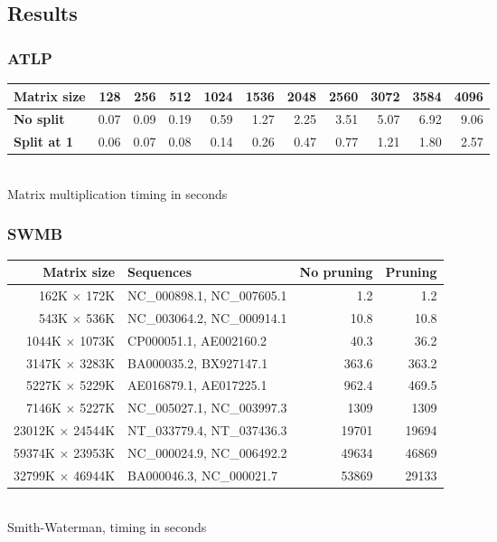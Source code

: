 \subsection*{Results}
\subsubsection*{ATLP\cite{gpu_atlp}}
\begin{center}\begin{tabular}{lrrrrrrrrrr} \toprule
\bf Matrix size & 128 & 256 & 512 & 1024 & 1536 & 2048 & 2560 & 3072 & 3584 & 4096 \\ \midrule
\bf No split & 0.07 & 0.09 & 0.19 & 0.59 & 1.27 & 2.25 & 3.51 & 5.07 & 6.92 & 9.06 \\
\bf Split at 1 & 0.06 & 0.07 & 0.08 & 0.14 & 0.26 & 0.47 & 0.77 & 1.21 & 1.80 & 2.57 \\ \bottomrule
\end{tabular} \\[4pt] Matrix multiplication timing in seconds \end{center}

\subsubsection*{SWMB\cite{swat_mega}}
\begin{center}\begin{tabular}{rlrr} \toprule
\bf Matrix size & \bf Sequences & \bf No pruning & \bf Pruning \\ \midrule
162K $\times$ 172K		& NC\_000898.1, NC\_007605.1	& 1.2 & 1.2 \\
543K $\times$ 536K		& NC\_003064.2, NC\_000914.1	& 10.8 & 10.8 \\
1044K $\times$ 1073K	& CP000051.1, AE002160.2		& 40.3 & 36.2 \\
3147K $\times$ 3283K	& BA000035.2, BX927147.1		& 363.6 & 363.2 \\ 
5227K $\times$ 5229K	& AE016879.1, AE017225.1		& 962.4 & 469.5 \\
7146K $\times$ 5227K	& NC\_005027.1, NC\_003997.3	& 1309 & 1309 \\
23012K $\times$ 24544K	& NT\_033779.4, NT\_037436.3	& 19701 & 19694 \\
59374K $\times$ 23953K	& NC\_000024.9, NC\_006492.2	& 49634 & 46869 \\
32799K $\times$ 46944K	& BA000046.3, NC\_000021.7		& 53869 & 29133 \\ \bottomrule
\end{tabular} \\[4pt] Smith-Waterman, timing in seconds \end{center}

